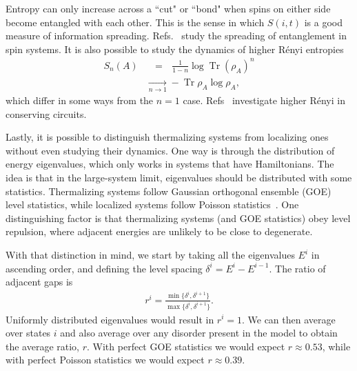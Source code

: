 \documentclass[a4paper,11pt]{article}
\renewcommand{\th}[1]{\frac{1}{#1}}
\newcommand{\nn}{\nonumber\\}
\DeclareMathOperator{\Tr}{Tr}
\begin{document}
Entropy can only increase across a ``cut" or ``bond" when spins on either side become entangled with each other. This is the sense in which $S(i,t)$ is a good measure of information spreading. Refs.~\cite{BardarsonPollmannMoore, NahumEntanglement, NahumRuhmanHuse, JonayEntanglement} study the spreading of entanglement in spin systems. It is also possible to study the dynamics of higher R\'{e}nyi entropies 
\begin{align}
S_n(A) & \hspace{8pt} =\hspace{8pt} \th{1-n}\log\Tr(\rho_A)^n\nn
&\xrightarrow[n\to 1]{}-\Tr\rho_A\log\rho_A,
\end{align}
which differ in some ways from the $n=1$ case. Refs~\cite{RakovskyDiff, HuangRenyi} investigate higher R\'{e}nyi in conserving circuits. 

Lastly, it is possible to distinguish thermalizing systems from localizing ones without even studying their dynamics. One way is through the distribution of energy eigenvalues, which only works in systems that have Hamiltonians. The idea is that in the large-system limit, eigenvalues should be distributed with some statistics. Thermalizing systems follow Gaussian orthogonal ensemble (GOE) level statistics, while localized systems follow Poisson statistics~\cite{OganesyanHuse}. One distinguishing factor is that thermalizing systems (and GOE statistics) obey level repulsion, where adjacent energies are unlikely to be close to degenerate.

With that distinction in mind, we start by taking all the eigenvalues $E^i$ in ascending order, and defining the level spacing $\delta^i = E^i-E^{i-1}$. The ratio of adjacent gaps is~\cite{OganesyanHuse}
\begin{align}
r^i = \frac{\min\{\delta^i, \delta^{i+1}\}}{\max\{\delta^i, \delta^{i+1}\}}.
\end{align}
Uniformly distributed eigenvalues would result in $r^i=1$. We can then average over states $i$ and also average over any disorder present in the model to obtain the average ratio, $r$. With perfect GOE statistics we would expect $r\approx0.53$, while with perfect Poisson statistics we would expect $r\approx0.39$.
\end{document}
